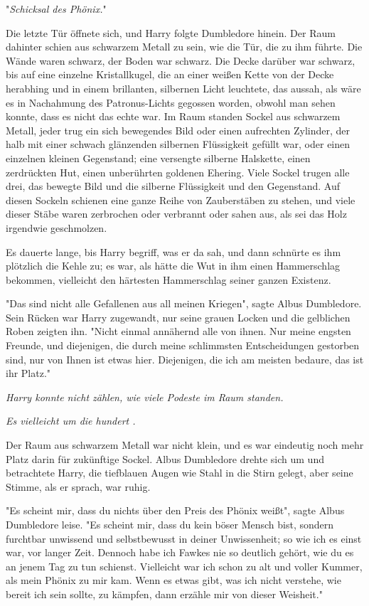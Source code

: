 {"\emph{Schicksal des Phönix.}"

Die letzte Tür öffnete sich, und Harry folgte Dumbledore hinein. Der Raum dahinter schien aus schwarzem Metall zu sein, wie die Tür, die zu ihm führte. Die Wände waren schwarz, der Boden war schwarz. Die Decke darüber war schwarz, bis auf eine einzelne Kristallkugel, die an einer weißen Kette von der Decke herabhing und in einem brillanten, silbernen Licht leuchtete, das aussah, als wäre es in Nachahmung des Patronus-Lichts gegossen worden, obwohl man sehen konnte, dass es nicht das echte war. Im Raum standen Sockel aus schwarzem Metall, jeder trug ein sich bewegendes Bild oder einen aufrechten Zylinder, der halb mit einer schwach glänzenden silbernen Flüssigkeit gefüllt war, oder einen einzelnen kleinen Gegenstand; eine versengte silberne Halskette, einen zerdrückten Hut, einen unberührten goldenen Ehering. Viele Sockel trugen alle drei, das bewegte Bild und die silberne Flüssigkeit und den Gegenstand. Auf diesen Sockeln schienen eine ganze Reihe von Zauberstäben zu stehen, und viele dieser Stäbe waren zerbrochen oder verbrannt oder sahen aus, als sei das Holz irgendwie geschmolzen.

Es dauerte lange, bis Harry begriff, was er da sah, und dann schnürte es ihm plötzlich die Kehle zu; es war, als hätte die Wut in ihm einen Hammerschlag bekommen, vielleicht den härtesten Hammerschlag seiner ganzen Existenz.

"Das sind nicht alle Gefallenen aus all meinen Kriegen", sagte Albus Dumbledore. Sein Rücken war Harry zugewandt, nur seine grauen Locken und die gelblichen Roben zeigten ihn. "Nicht einmal annähernd alle von ihnen. Nur meine engsten Freunde, und diejenigen, die durch meine schlimmsten Entscheidungen gestorben sind, nur von Ihnen ist etwas hier. Diejenigen, die ich am meisten bedaure, das ist ihr Platz."

\emph{Harry konnte nicht zählen, wie viele Podeste im Raum standen.}

\emph{Es vielleicht um die hundert .}

Der Raum aus schwarzem Metall war nicht klein, und es war eindeutig noch mehr Platz darin für zukünftige Sockel. Albus Dumbledore drehte sich um und betrachtete Harry, die tiefblauen Augen wie Stahl in die Stirn gelegt, aber seine Stimme, als er sprach, war ruhig.

"Es scheint mir, dass du nichts über den Preis des Phönix weißt", sagte Albus Dumbledore leise. "Es scheint mir, dass du kein böser Mensch bist, sondern furchtbar unwissend und selbstbewusst in deiner Unwissenheit; so wie ich es einst war, vor langer Zeit. Dennoch habe ich Fawkes nie so deutlich gehört, wie du es an jenem Tag zu tun schienst. Vielleicht war ich schon zu alt und voller Kummer, als mein Phönix zu mir kam. Wenn es etwas gibt, was ich nicht verstehe, wie bereit ich sein sollte, zu kämpfen, dann erzähle mir von dieser Weisheit."

}
